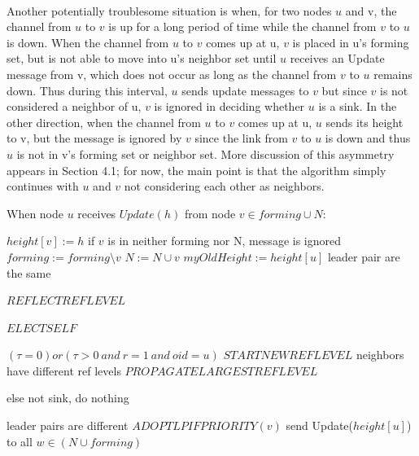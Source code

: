 \paragraph{}Another potentially troublesome situation is when, for two nodes $u$ and v, the channel from $u$ to $v$ is up for a long period of time while the channel from $v$ to $u$ is down. When the channel from $u$ to $v$ comes up at u, $v$ is placed in u’s forming set, but is not able to move into u’s neighbor set until $u$ receives an Update message from v, which does not occur as long as the channel from $v$ to $u$ remains down. Thus during this interval, $u$ sends update messages to $v$ but since $v$ is not considered a neighbor of u, $v$ is ignored in deciding whether $u$ is a sink. In the other direction, when the channel from $u$ to $v$ comes up at u, $u$ sends its height to v, but the message is ignored by $v$ since the link from $v$ to $u$ is down and thus $u$ is not in v’s forming set or neighbor set. More discussion of this asymmetry appears in Section 4.1; for now, the main point is that the algorithm simply continues with $u$ and $v$ not considering each other as neighbors.

\begin{algorithm}
	\caption{When node $u$ receives $Update(h)$ from node $v \in forming \cup N$:}
\begin{algorithmic}[1]
	
	\State $height[v] := h$ \Comment if $v$ is in neither forming nor N, message is ignored
	\State $forming := forming \setminus {v}$
	\State $N := N \cup {v}$
	\State $myOldHeight := height[u]$
	 \Comment leader pair are the same
	
	
		\State $REFLECTREFLEVEL$
	
		\State $ELECTSELF$
		
		\Else \Comment $(\tau = 0) or (\tau > 0~and~r = 1~and~oid = u)$
		\State $STARTNEWREFLEVEL$
		\EndIf
	\Else \Comment neighbors have different ref levels
	\State $PROPAGATELARGESTREFLEVEL$
	
	\EndIf 
	
	\EndIf \Comment else not sink, do nothing
	
	\Else \Comment leader pairs are different
	\State $ADOPTLPIFPRIORITY(v)$	
	\EndIf
	\State send Update($height[u]$) to all $w \in (N \cup forming)$
	\EndIf
	
\end{algorithmic}

\end{algorithm}

